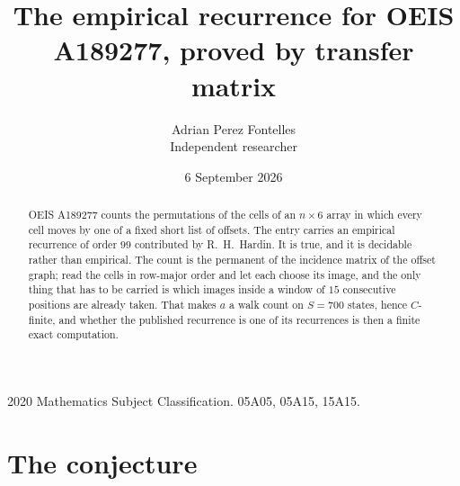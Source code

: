 \documentclass[11pt,a4paper]{article}
\title{The empirical recurrence for OEIS A189277, proved by transfer matrix}
\author{Adrian Perez Fontelles\\ \small Independent researcher}
\date{6 September 2026}
\theoremstyle{plain}
\theoremstyle{definition}
\begin{document}
\maketitle

\begin{abstract}
OEIS A189277 counts the permutations of the cells of an $n\times6$ array in which every cell
moves by one of a fixed short list of offsets. The entry carries an empirical recurrence of
order $99$ contributed by R.~H.~Hardin. It is true, and it is decidable rather than
empirical. The count is the permanent of the incidence matrix of the offset graph; read the
cells in row-major order and let each choose its image, and the only thing that has to be
carried is which images inside a window of $15$ consecutive positions are already taken.
That makes $a$ a walk count on $S=700$ states, hence $C$-finite, and whether the published
recurrence is one of its recurrences is then a finite exact computation.
\end{abstract}

\noindent\small 2020 Mathematics Subject Classification. 05A05, 05A15, 15A15.\normalsize

\section{The conjecture}
\end{document}
